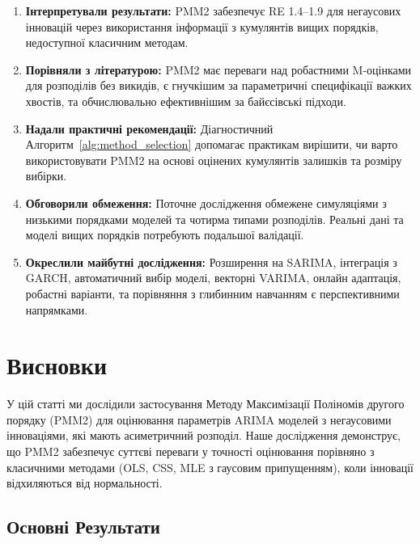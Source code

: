 \documentclass[12pt,a4paper]{article}
\begin{document}
\begin{enumerate}
    \item \textbf{Інтерпретували результати:} PMM2 забезпечує RE 1.4--1.9 для негаусових інновацій через використання інформації з кумулянтів вищих порядків, недоступної класичним методам.

    \item \textbf{Порівняли з літературою:} PMM2 має переваги над робастними M-оцінками для розподілів без викидів, є гнучкішим за параметричні специфікації важких хвостів, та обчислювально ефективнішим за байєсівські підходи.

    \item \textbf{Надали практичні рекомендації:} Діагностичний Алгоритм~\ref{alg:method_selection} допомагає практикам вирішити, чи варто використовувати PMM2 на основі оцінених кумулянтів залишків та розміру вибірки.

    \item \textbf{Обговорили обмеження:} Поточне дослідження обмежене симуляціями з низькими порядками моделей та чотирма типами розподілів. Реальні дані та моделі вищих порядків потребують подальшої валідації.

    \item \textbf{Окреслили майбутні дослідження:} Розширення на SARIMA, інтеграція з GARCH, автоматичний вибір моделі, векторні VARIMA, онлайн адаптація, робастні варіанти, та порівняння з глибинним навчанням є перспективними напрямками.
\end{enumerate}


\section{Висновки}
\label{sec:conclusion}

У цій статті ми дослідили застосування Методу Максимізації Поліномів другого порядку (PMM2) для оцінювання параметрів ARIMA моделей з негаусовими інноваціями, які мають асиметричний розподіл. Наше дослідження демонструє, що PMM2 забезпечує суттєві переваги у точності оцінювання порівняно з класичними методами (OLS, CSS, MLE з гаусовим припущенням), коли інновації відхиляються від нормальності.

\subsection{Основні Результати}
\label{subsec:main_findings}
\end{document}
